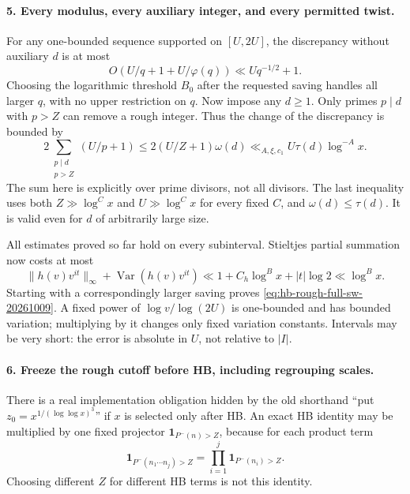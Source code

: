 \paragraph{5. Every modulus, every auxiliary integer, and every permitted twist.}
For any one-bounded sequence supported on $[U,2U]$, the discrepancy
without auxiliary $d$ is at most
\[
 O(U/q+1+U/\varphi(q))\ll Uq^{-1/2}+1.
\]
Choosing the logarithmic threshold $B_0$ after the requested saving
handles all larger $q$, with no upper restriction on $q$.
Now impose any $d\ge1$. Only primes $p\mid d$ with $p>Z$ can remove
a rough integer. Thus the change of the discrepancy is bounded by
\[
 2\sum_{\substack{p\mid d\\p>Z}}(U/p+1)
 \le2(U/Z+1)\omega(d)
 \ll_{A,\xi,c_1}U\tau(d)\log^{-A}x.                       \tag{R7}
\]
The sum here is explicitly over prime divisors, not all divisors.
The last inequality uses both $Z\gg\log^C x$ and
$U\gg\log^C x$ for every fixed $C$, and $\omega(d)\le\tau(d)$.
It is valid even for $d$ of arbitrarily large size.

All estimates proved so far hold on every subinterval. Stieltjes
partial summation now costs at most
\[
 \|h(v)v^{it}\|_\infty+\operatorname{Var}(h(v)v^{it})
 \ll 1+C_h\log^B x+|t|\log2\ll\log^B x.
\]
Starting with a correspondingly larger saving proves
\eqref{eq:hb-rough-full-sw-20261009}. A fixed power of
$\log v/\log(2U)$ is one-bounded and has bounded variation; multiplying
by it changes only fixed variation constants. Intervals may be very
short: the error is absolute in $U$, not relative to $|I|$.

\paragraph{6. Freeze the rough cutoff before HB, including regrouping scales.}
There is a real implementation obligation hidden by the old shorthand
``put $z_0=x^{1/(\log\log x)^3}$'' if $x$ is selected only after HB.
An exact HB identity may be multiplied by one fixed projector
$\mathbf1_{P^-(n)>Z}$, because for each product term
\[
 \mathbf1_{P^-(n_1\cdots n_j)>Z}
       =\prod_{i=1}^j\mathbf1_{P^-(n_i)>Z}.                 \tag{R8}
\]
Choosing different $Z$ for different HB terms is not this identity.

